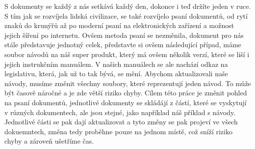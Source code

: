 S dokumenty se každý z nás setkává každý den, dokonce i teď držíte jeden v ruce. S tím jak se rozvíjela lidská civilizace,
se také rozvíjelo psaní dokumentů, od rytí znaků do krunýřů až po moderní psaní na elektronických zařízení a možnost jejich šíření po internetu.
Ovšem metoda psaní se nezměnila, dokument pro nás stále představuje jednotný celek, představte si ovšem následující případ, máme soubor návodů na náš super
produkt, který má ovšem několik verzí, které se liší i jejich instrukčním manuálem. V našich manuálech se ale nachází odkaz na legislativu, která, jak už to tak
bývá, se mění. Abychom aktualizovali naše návody, musíme změnit všechny soubory, které reprezentují jeden návod. To může být časově náročné a je zde větší riziko
chyby. Cílem této práce je změnit pohled na psaní dokumentů, jednotlivé dokumenty se skládájí z částí, které se vyskytují v různých dokumentech, ale jsou stejné,
jako například náš příklad s návody. Jednotlivé části se pak dají aktualizovat a tyto změny se pak projeví ve všech dokuemntech, změna tedy proběhne
pouze na jednom místě, což sníží riziko chyby a zároveň ušetříme čas.